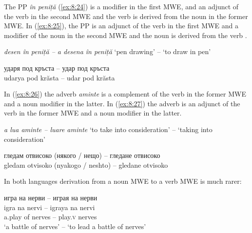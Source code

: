 \documentclass[output=paper]{langsci/langscibook}
\begin{document}
The PP \textit{în peniță} (\ref{ex:8:24}) is a modifier in the first MWE, and an adjunct
of the verb in the second MWE and the verb is derived from the noun in
the former MWE. In (\ref{ex:8:25}), the PP 
 is an adjunct of the verb
in the first MWE and a modifier of the noun 
 in the second MWE
and the noun is derived from the verb 
.


\begin{exe}
\ex \label{ex:8:24}
\settowidth{}
\textit{desen în peniță  -- a desena în peniță} 
‘pen drawing’ -- ‘to draw in pen’
\end{exe}

\begin{exe}
\ex \label{ex:8:25}
\settowidth{}
\gll ударя под кръста -- удар под кръста\\
udarya pod krăsta -- udar pod krăsta\\ 
\end{exe}

In (\ref{ex:8:26}) the adverb \textit{aminte} is a complement of the verb in the former
MWE and a noun modifier in the latter. In (\ref{ex:8:27}) the adverb  is
an adjunct of the verb  in the former MWE and a noun modifier
in the latter. 

\begin{exe}
\ex \label{ex:8:26}
\settowidth{}
\textit{a lua aminte  -- luare aminte} 
‘to take into consideration’ -- ‘taking into consideration’
\end{exe}

\begin{exe}
\ex \label{ex:8:27}
\settowidth{}
\gll гледам отвисоко (някого / нещо) -- гледане отвисоко\\
gledam otvisoko (nyakogo / neshto) -- gledane otvisoko\\ 
\end{exe}



In both languages derivation from a noun MWE to a verb MWE is much rarer:

\begin{exe}
\ex \label{ex:8:28}
\settowidth{}
\glll игра на нерви -- играя на нерви\\
igra na nervi -- igraya na nervi\\ 
 {a.play} of nerves -- play.\textsc{v} {} nerves\\  
 \glt ‘a battle of nerves’ -- ‘to lead a battle of nerves’
\end{exe}
\end{document}
